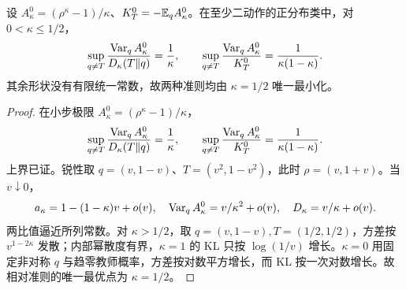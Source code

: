 \begin{theorem}[相对教师误差的锐小步方差常数]
设 $A_\kappa^0=(\rho^\kappa-1)/\kappa$、$K_T^0=-\mathbb E_qA_\kappa^0$。在至少二动作的正分布类中，对 $0<\kappa\le1/2$，
\begin{equation}
\sup_{q\ne T}\frac{\operatorname{Var}_qA_\kappa^0}{D_\kappa(T\Vert q)}=\frac1\kappa,\qquad
\sup_{q\ne T}\frac{\operatorname{Var}_qA_\kappa^0}{K_T^0}=\frac1{\kappa(1-\kappa)}.
\end{equation}
其余形状没有有限统一常数，故两种准则均由 $\kappa=1/2$ 唯一最小化。
\end{theorem}
\begin{proof}
在小步极限 $A^0_\kappa=(\rho^\kappa-1)/\kappa$，
\begin{equation}
\sup_{q\ne T}\frac{\operatorname{Var}_qA^0_\kappa}{D_\kappa(T\Vert q)}=\frac1\kappa,\qquad
\sup_{q\ne T}\frac{\operatorname{Var}_qA^0_\kappa}{K_T^0}=\frac1{\kappa(1-\kappa)}.
\end{equation}
上界已证。锐性取 $q=(v,1-v)$、$T=(v^2,1-v^2)$，此时 $\rho=(v,1+v)$。当 $v\downarrow0$，
\begin{equation}
a_\kappa=1-(1-\kappa)v+o(v),\quad
\operatorname{Var}_qA^0_\kappa=v/\kappa^2+o(v),\quad
D_\kappa=v/\kappa+o(v).
\end{equation}
两比值逼近所列常数。对 $\kappa>1/2$，取 $q=(v,1-v),T=(1/2,1/2)$，方差按 $v^{1-2\kappa}$ 发散；内部幂散度有界，$\kappa=1$ 的 KL 只按 $\log(1/v)$ 增长。$\kappa=0$ 用固定非对称 $q$ 与趋零教师概率，方差按对数平方增长，而 KL 按一次对数增长。故相对准则的唯一最优点为 $\kappa=1/2$。
\end{proof}

